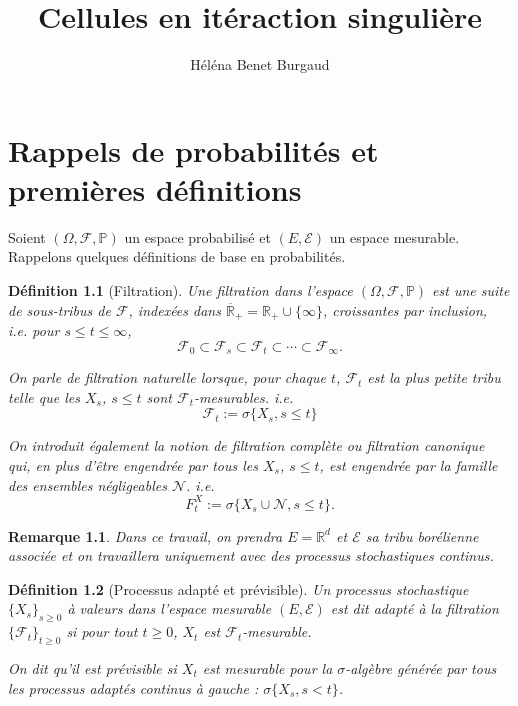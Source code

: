\documentclass[openany]{book}
\title{Cellules en itéraction singulière}
\author{Héléna Benet Burgaud}
\newcommand{\F}{\mathscr{F}}
\newcommand{\N}{\mathscr{N}}
\newcommand{\carE}{\mathscr{E}}
\renewcommand{\P}{\mathds{P}}
\newcommand{\R}{\mathbb{R}}
\newcommand{\1}{\mathbbm{1}}
\theoremstyle{thmfont}
\theoremstyle{deffont}
\newtheorem{definition}[definition]{Définition}
\theoremstyle{thmfont}
\theoremstyle{deffont}
\newtheorem*{remark}{Remarque}
\begin{document}

\tableofcontents
\clearpage
{} %
\setcounter{page}{1}
\let\cleardoublepage\relax

\chapter{Rappels de probabilités et premières définitions}

Soient $(\Omega, \F, \P )$ un espace probabilisé et $(E, \carE)$ un espace mesurable. Rappelons quelques définitions de base en probabilités.

\begin{definition}[Filtration] Une \textit{filtration} dans l'espace $(\Omega, \F, \P )$ est une suite de sous-tribus de $\F$, indexées dans $\overline{\R}_+ = \R_+ \cup \{\infty\}$, croissantes par inclusion, \\
i.e. pour $s \leq t \leq \infty$,
$$\F_0 \subset \F_s \subset \F_t\subset \cdots \subset \F_\infty .$$

On parle de \textit{filtration naturelle} lorsque, pour chaque $t$, $\F_t$ est la plus petite tribu telle que les $X_s$, $s\leq t$ sont $\F_t$-mesurables. i.e.
$$\F_t := \sigma\{X_s, s\leq t\}$$

On introduit également la notion de \textit{filtration complète} ou
\textit{filtration canonique} qui, en plus d'être engendrée par tous les $X_s$, $s \leq t$, est engendrée par la famille des ensembles négligeables $\N$. i.e.
$$F^X_t := \sigma\{X_s\cup \N, s\leq t\}.$$

\label{def:filtration}
\end{definition}

\begin{remark}
Dans ce travail, on prendra $E = \R^d$ et $\carE$ sa tribu borélienne associée et on travaillera uniquement avec des processus stochastiques continus.
\end{remark}

\begin{definition}[Processus adapté et prévisible] Un processus stochastique $\{X_s\}_{s\ge0}$ à valeurs dans l'espace mesurable $(E, \carE)$ est dit \textit{adapté} à la filtration $\{\F_t\}_{t\geq0}$ si pour tout $t\geq0$, $X_t$ est $\F_t$-mesurable.

  On dit qu'il est \textit{prévisible} si $X_t$ est mesurable pour la $\sigma$-algèbre générée par tous les processus adaptés continus à gauche : $\sigma\{X_s, s<t\}$.
\label{def:pr_adapte}
\end{definition}
\end{document}
